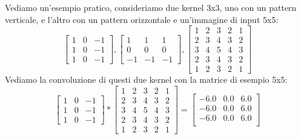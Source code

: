 \vspace{1cm}
Vediamo un'esempio pratico, consideriamo due kernel 3x3, uno con un pattern verticale, e l'altro con un pattern orizzontale e un'immagine di input 5x5:
\begin{equation}
    \label{eq:kernel_v_det_example}
    \begin{bmatrix}
        1 & 0 & -1 \\
        1 & 0 & -1 \\
        1 & 0 & -1
    \end{bmatrix} , 
    \begin{bmatrix}
        1 & 1 & 1 \\
        0 & 0 & 0 \\
        -1 & -1 & -1
    \end{bmatrix} ,
    \begin{bmatrix}
        1 & 2 & 3 & 2 & 1 \\
        2 & 3 & 4 & 3 & 2 \\
        3 & 4 & 5 & 4 & 3 \\
        2 & 3 & 4 & 3 & 2 \\
        1 & 2 & 3 & 2 & 1
    \end{bmatrix}
\end{equation}
Vediamo la convoluzione di questi due kernel con la matrice di esempio 5x5:
\begin{equation}
    \label{eq:convolution_example}
    \begin{bmatrix}
        1 & 0 & -1 \\
        1 & 0 & -1 \\
        1 & 0 & -1
    \end{bmatrix} *
    \begin{bmatrix}
        1 & 2 & 3 & 2 & 1 \\
        2 & 3 & 4 & 3 & 2 \\
        3 & 4 & 5 & 4 & 3 \\
        2 & 3 & 4 & 3 & 2 \\
        1 & 2 & 3 & 2 & 1
    \end{bmatrix} =
    \begin{bmatrix}
        -6.0 & 0.0 & 6.0 \\
        -6.0 & 0.0 & 6.0 \\
        -6.0 & 0.0 & 6.0 \\
    \end{bmatrix}
\end{equation}
